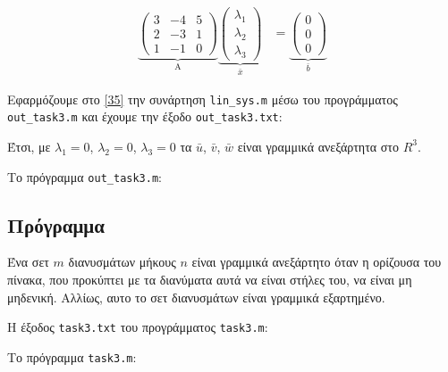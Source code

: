 \documentclass[12pt, fleqn, leqno]{extreport}
\begin{document}
\begin{equation}
    \begin{aligned}%
        \underbrace{
            \begin{pmatrix}
                3 & -4 & 5 \\
                2 & -3 & 1 \\
                1 & -1 & 0
            \end{pmatrix}
        }_\text{A}
        \underbrace{
            \begin{pmatrix}
                \lambda_{1} \\
                \lambda_{2} \\
                \lambda_{3}
            \end{pmatrix}
        }_\text{$\bar{x}$}
         & =
        \underbrace{
            \begin{pmatrix}
                0 \\
                0 \\
                0
            \end{pmatrix}
        }_\text{$\bar{b}$}
    \end{aligned}\label{35}
\end{equation}

Εφαρμόζουμε στο \eqref{35} την συνάρτηση \lstinline[language={}]{lin_sys.m} μέσω του προγράμματος \lstinline[language={}]{out_task3.m} και έχουμε την έξοδο \lstinline[language={}]{out_task3.txt}:


Έτσι, με $\lambda_{1} = 0$, $\lambda_{2} = 0$, $\lambda_{3} = 0$ τα $\bar{u}$, $\bar{v}$, $\bar{w}$ είναι γραμμικά ανεξάρτητα στο $R^{3}$.

Το πρόγραμμα \lstinline[language={}]{out_task3.m}:

\newpage

\subsection{Πρόγραμμα}

Ένα σετ $m$ διανυσμάτων μήκους $n$ είναι γραμμικά ανεξάρτητο όταν η ορίζουσα του πίνακα, που προκύπτει με τα διανύματα αυτά να είναι στήλες του, να είναι μη μηδενική. Αλλίως, αυτο το σετ διανυσμάτων είναι γραμμικά εξαρτημένο.

Η έξοδος \lstinline[language={}]{task3.txt} του προγράμματος \lstinline[language={}]{task3.m}:


Το πρόγραμμα \lstinline[language={}]{task3.m}:

\end{document}
